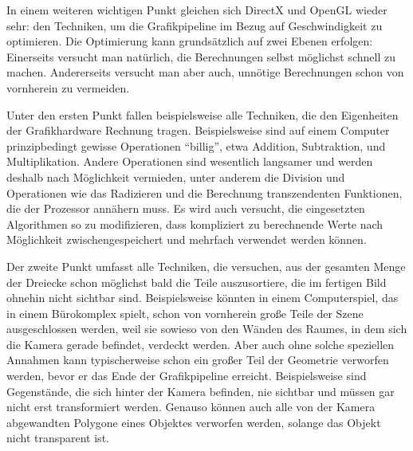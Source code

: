 \label{performance}
In einem weiteren wichtigen Punkt gleichen sich DirectX und OpenGL wieder sehr: den Techniken, um die Grafikpipeline im Bezug auf Geschwindigkeit zu optimieren. Die Optimierung kann grundsätzlich auf zwei Ebenen erfolgen: Einerseits versucht man natürlich, die Berechnungen selbst möglichst schnell zu machen. Andererseits versucht man aber auch, unnötige Berechnungen schon von vornherein zu vermeiden.

Unter den ersten Punkt fallen beispielsweise alle Techniken, die den Eigenheiten der Grafikhardware Rechnung tragen. Beispielsweise sind auf einem Computer prinzipbedingt gewisse Operationen \enquote{billig}, etwa Addition, Subtraktion, und Multiplikation. Andere Operationen sind wesentlich langsamer und werden deshalb nach Möglichkeit vermieden, unter anderem die Division und Operationen wie das Radizieren und die Berechnung transzendenten Funktionen, die der Prozessor annähern muss. Es wird auch versucht, die eingesetzten Algorithmen so zu modifizieren, dass kompliziert zu berechnende Werte nach Möglichkeit zwischengespeichert und mehrfach verwendet werden können.

Der zweite Punkt umfasst alle Techniken, die versuchen, aus der gesamten Menge der Dreiecke schon möglichst bald die Teile auszusortiere, die im fertigen Bild ohnehin nicht sichtbar sind. Beispielsweise könnten in einem Computerspiel, das in einem Bürokomplex spielt, schon von vornherein große Teile der Szene ausgeschlossen werden, weil sie sowieso von den Wänden des Raumes, in dem sich die Kamera gerade befindet, verdeckt werden. Aber auch ohne solche speziellen Annahmen kann typischerweise schon ein großer Teil der Geometrie verworfen werden, bevor er das Ende der Grafikpipeline erreicht. Beispielsweise sind Gegenstände, die sich hinter der Kamera befinden, nie sichtbar und müssen gar nicht erst transformiert werden. Genauso können auch alle von der Kamera abgewandten Polygone eines Objektes verworfen werden, solange das Objekt nicht transparent ist.